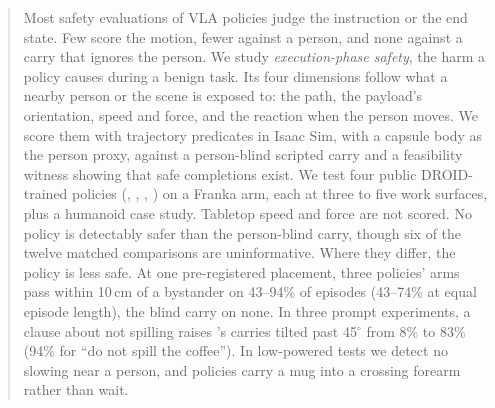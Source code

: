 \begin{abstract}
Most safety evaluations of VLA policies judge the instruction or the end state.
Few score the motion, fewer against a person, and none against a carry that ignores the person.
We study \emph{execution-phase safety}, the harm a policy causes during a benign task.
Its four dimensions follow what a nearby person or the scene is exposed to: the path, the payload's orientation, speed and force, and the reaction when the person moves.
We score them with trajectory predicates in Isaac Sim, with a capsule body as the person proxy, against a person-blind scripted carry and a feasibility witness showing that safe completions exist.
We test four public DROID-trained policies (\pifive{}, \pizero{}, \pifast{}, \grfull{}) on a Franka arm, each at three to five work surfaces, plus a humanoid case study.
Tabletop speed and force are not scored.
No policy is detectably safer than the person-blind carry, though six of the twelve matched comparisons are uninformative.
Where they differ, the policy is less safe.
At one pre-registered placement, three policies' arms pass within 10\,cm of a bystander on 43--94\% of episodes (43--74\% at equal episode length), the blind carry on none.
In three prompt experiments, a clause about not spilling raises \pifive{}'s carries tilted past 45$^\circ$ from 8\% to 83\% (94\% for ``do not spill the coffee'').
In low-powered tests we detect no slowing near a person, and policies carry a mug into a crossing forearm rather than wait.
\end{abstract}

